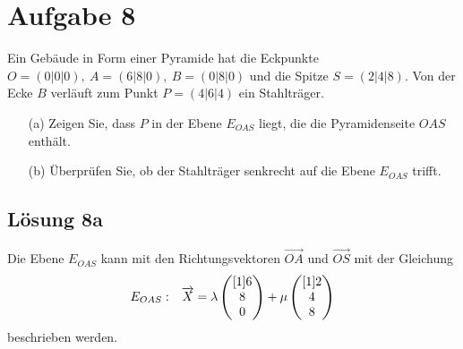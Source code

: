 \section{Aufgabe 8}

Ein Gebäude in Form einer Pyramide hat die Eckpunkte $O=( 0|0|0) ,\ A=( 6|8|0) ,\ B=( 0|8|0)$ und die Spitze $S=( 2|4|8)$. Von der Ecke $B$ verläuft zum Punkt $P=( 4|6|4)$ ein Stahlträger.

\begin{enumerate}
	\item[(a)] Zeigen Sie, dass $P$ in der Ebene $E_{OAS}$ liegt, die die Pyramidenseite $OAS$ enthält.
	\item[(b)] Überprüfen Sie, ob der Stahlträger senkrecht auf die Ebene $E_{OAS}$ trifft.
\end{enumerate}


\subsection{Lösung 8a}

Die Ebene $E_{OAS}$ kann mit den Richtungsvektoren $\overrightarrow{OA}$ und $\overrightarrow{OS}$ mit der Gleichung
\begin{equation*}
	\begin{array}{ r l }
		E_{OAS} : & \vec{X} =\lambda \begin{pmatrix}[1]
			6\\
			8\\
			0
		\end{pmatrix} +\mu \begin{pmatrix}[1]
			2\\
			4\\
			8
		\end{pmatrix}
	\end{array}
\end{equation*}
beschrieben werden.

